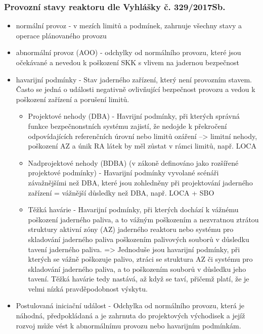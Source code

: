 \subsubsection{Provozní stavy reaktoru dle Vyhlášky č. 329/2017Sb.}
\begin{itemize}
	\item normální provoz - v mezích limitů a podmínek, zahrnuje všechny stavy a operace plánovaného provozu
	\item abnormální provoz (AOO) - odchylky od normálního provozu, které jsou očekávané a nevedou k poškození SKK s vlivem na jadernou bezpečnost
	\item havarijní podmínky - Stav jaderného zařízení, který není provozním stavem. Často se jedná o události negativně ovlivňující bezpečnost provozu a vedou k poškození zařízení a porušení limitů.
	\begin{itemize}
	    \item Projektové nehody (DBA) - Havrijní podmínky, při kterých správná funkce bezpečnonstních systému zajistí, že nedojde k překročení odpovídajících referenčních úrovní nebo limitů ozáření --> limitní nehody, poškození AZ a únik RA látek by měl zůstat v rámci limitů, např. LOCA
            \item Nadprojektové nehody (BDBA) (v zákoně definováno jako rozšířené projektové podmínky) - Havarijní podmínky vyvolané scénáři závažnějšími než DBA, které jsou zohledněny při projektování jaderného zařízení = vážnější důsledky než DBA, např. LOCA + SBO
            \item Těžká havárie - Havarijní podmínky, při kterých dochází k vážnému poškození jaderného paliva, a to vážným poškozením a nezvratnou ztrátou struktury aktivní zóny (AZ) jaderného reaktoru nebo systému pro skladování jaderného paliva poškozením palivových souborů v důsledku tavení jaderného paliva. => Jednoduše jsou havarijní podmínky, při kterých se vážně poškozuje palivo, ztráci se struktura AZ či systému pro skladování jaderného paliva, a to poškozením souborů v důsledku jeho tavení. Těžká havárie tedy nastává, až když se taví, přičemž platí, že je velmi nízká pravděpodobnost výskytu. 
	\end{itemize}
        \item Postulovaná iniciační událost - Odchylka od normálního provozu, která je náhodná, předpokládaná a je zahrnuta do projektových východisek a jejíž rozvoj může vést k abnormálnímu provozu nebo havarijním podmínkám.
\end{itemize}

